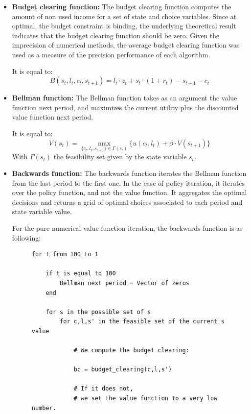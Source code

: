 \documentclass{article}
\begin{document}
\begin{itemize}
    \item \textbf{Budget clearing function: } 
    The budget clearing function computes the amount of non used income for a 
    set of state and choice variables. Since at optimal, the budget constraint is binding, 
    the underlying theoretical result indicates that the budget clearing function should be 
    zero. Given the imprecision of numerical methods, the average budget clearing function was used 
    as a measure of the precision performance of each algorithm.

    It is equal to: 
    $$B(s_{t},l_{t},c_{t},s_{t+1})=l_{t} \cdot z_{t} + s_{t}\cdot(1+r_{t}) - s_{t+1} - c_{t}$$

    \item \textbf{Bellman function: }
    The Bellman function takes as an argument the value function next period, 
    and maximizes the current utility plus the discounted value function next period. 

    It is equal to: 
    $$V(s_{t}) = \max_{\{c_{t},l_{t},s_{t+1}\}\in \Gamma(s_{t})} \{u(c_{t},l_{t}) + \beta \cdot V(s_{t+1})\}$$
    With $\Gamma(s_{t})$ the feasibility set given by the state variable $s_{t}$.

    \item \textbf{Backwards function: }
    The backwards function iterates the Bellman function from the last period 
    to the first one. In the case of policy iteration, it iterates over the 
    policy function, and not the value function. It aggregates the optimal decisions 
    and returns a grid of optimal choices associated to each period and state variable value.

    For the pure numerical value function iteration, the backwards function is
    as following: 
    \begin{figure}[H]
    \begin{lstlisting}[basicstyle=\small]
for t from 100 to 1

    if t is equal to 100
        Bellman next period = Vector of zeros
    end

    for s in the possible set of s
        for c,l,s' in the feasible set of the current s value
            
            # We compute the budget clearing: 

            bc = budget_clearing(c,l,s') 

            # If it does not,
            # we set the value function to a very low number.
            

\end{lstlisting}
\end{figure}
\end{itemize}
\end{document}
